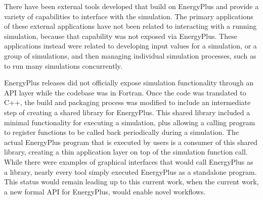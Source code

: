\documentclass[5p, authoryear]{elsarticle}
\begin{document}
There have been external tools developed that build on EnergyPlus and provide a variety of capabilities to interface with the simulation. \citep{Campos2020, Guglielmetti2011}
The primary applications of these external applications have not been related to interacting with a running simulation, because that capability was not exposed via EnergyPlus.  
These applications instead were related to developing input values for a simulation, or a group of simulations, and then managing individual simulation processes, such as to run many simulations concurrently.

EnergyPlus releases did not officially expose simulation functionality through an API layer while the codebase was in Fortran.  
Once the code was translated to C++, the build and packaging process was modified to include an intermediate step of creating a shared library for EnergyPlus.
This shared library included a minimal functionality for executing a simulation, plus allowing a calling program to register functions to be called back periodically during a simulation.
The actual EnergyPlus program that is executed by users is a consumer of this shared library, creating a thin application layer on top of the simulation function call.
While there were examples of graphical interfaces that would call EnergyPlus as a library, nearly every tool simply executed EnergyPlus as a standalone program.
This status would remain leading up to this current work, when the current work, a new formal API for EnergyPlus, would enable novel workflows.
\end{document}
